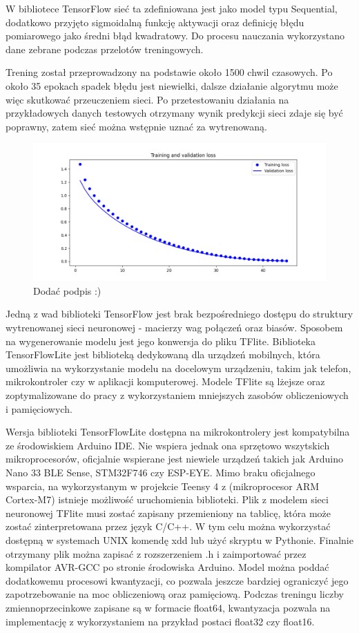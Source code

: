 \documentclass[12pt, a4paper]{article}
\begin{document}
W bibliotece TensorFlow sieć ta zdefiniowana jest jako model typu Sequential, dodatkowo przyjęto sigmoidalną funkcję aktywacji oraz definicję błędu pomiarowego jako średni błąd kwadratowy. Do procesu nauczania wykorzystano dane zebrane podczas przelotów treningowych.


Trening został przeprowadzony na podstawie około 1500 chwil czasowych. Po około 35 epokach spadek błędu jest niewielki, dalsze działanie algorytmu może więc skutkować przeuczeniem sieci. Po przetestowaniu działania na przykładowych danych testowych otrzymany wynik predykcji sieci zdaje się być poprawny, zatem sieć można wstępnie uznać za wytrenowaną.

 \begin{figure}[H]
    \centering
    \includegraphics[width=1\textwidth]{tfloss}
    \caption{Dodać podpis :)}
\end{figure}

Jedną z wad biblioteki TensorFlow jest brak bezpośredniego dostępu do struktury wytrenowanej sieci neuronowej - macierzy wag połączeń oraz biasów. Sposobem na wygenerowanie modelu jest jego konwersja do pliku TFlite. Biblioteka TensorFlowLite jest biblioteką dedykowaną dla urządzeń mobilnych, która umożliwia na wykorzystanie modelu na docelowym urządzeniu, takim jak telefon, mikrokontroler czy w aplikacji komputerowej. Modele TFlite są lżejsze oraz zoptymalizowane do pracy z wykorzystaniem mniejszych zasobów obliczeniowych i pamięciowych.

Wersja biblioteki TensorFlowLite dostępna na mikrokontrolery jest kompatybilna ze środowiskiem Arduino IDE. Nie wspiera jednak ona sprzętowo wszytskich mikroprocesorów, oficjalnie wspierane jest niewiele urządzeń takich jak Arduino Nano 33 BLE Sense, STM32F746 czy ESP-EYE. Mimo braku oficjalnego wsparcia, na wykorzystanym w projekcie Teensy 4 z (mikroprocesor ARM Cortex-M7) istnieje możliwość uruchomienia biblioteki. Plik z modelem sieci neuronowej TFlite musi zostać zapisany przemieniony na tablicę, która może zostać zinterpretowana przez język C/C++. W tym celu można wykorzystać dostępną w systemach UNIX komendę xdd lub użyć skryptu w Pythonie. Finalnie otrzymany plik można zapisać z rozszerzeniem .h i zaimportować przez kompilator AVR-GCC po stronie środowiska Arduino. Model można poddać dodatkowemu procesowi kwantyzacji, co pozwala jeszcze bardziej ograniczyć jego zapotrzebowanie na moc obliczeniową oraz pamięciową. Podczas treningu liczby zmiennoprzecinkowe zapisane są w formacie float64, kwantyzacja pozwala na implementację z wykorzystaniem na przykład postaci float32 czy float16.
\end{document}
